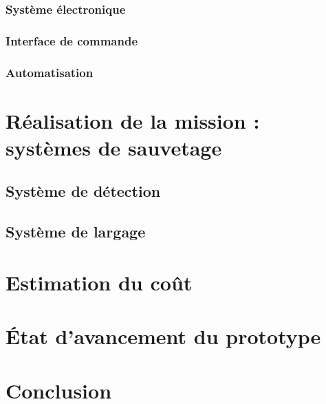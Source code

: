 \documentclass[a4paper,12pt,french]{report}
\begin{document}
\subsection{Système électronique}

\subsection{Interface de commande}

\subsection{Automatisation}

\chapter{Réalisation de la mission : systèmes de sauvetage}

\section{Système de détection}

\section{Système de largage}

\chapter{Estimation du coût}

\chapter{État d'avancement du prototype}

\chapter*{Conclusion}
\end{document}
